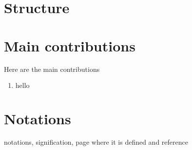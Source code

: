 \section{Structure}


\section{Main contributions}
\noindent
Here are the main contributions
\vspace{1cm}
\begin{enumerate}
    \item hello
\end{enumerate}

\clearpage
\section{Notations}

%
notations, signification, page where it is defined and reference
\
